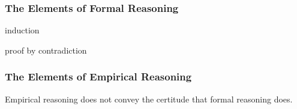 \subsubsection{The Elements of Formal Reasoning}

induction

proof by contradiction

\subsubsection{The Elements of Empirical Reasoning}

Empirical reasoning does not convey the certitude that formal
reasoning does.  


